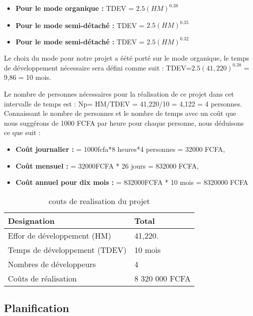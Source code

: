 {{\begin{itemize}[label=\textbullet, font=\LARGE \color{blue}] 
	\item \textbf{Pour le mode organique  :} TDEV = $2.5(HM)^{0.38}$
	\item \textbf{Pour le mode semi-détaché :} TDEV = $2.5(HM)^{0.35}$
	\item \textbf{Pour le mode semi-détaché :} TDEV = $2.5(HM)^{0.32}$
\end{itemize}

Le choix du mode pour notre projet a éété porté sur le mode organique, le temps de développement nécessaire sera défini comme suit :  TDEV=$2.5(41,220)^{0.38}$ = 9,86 = 10 mois.

Le nombre de personnes nécessaires pour la réalisation de ce projet dans cet intervalle de temps est : Np= HM/TDEV = 41,220/10 = 4,122 = 4 personnes. Connaissant le nombre de personnes et le nombre de temps avec un coût que nous suggérons de 1000 FCFA par heure pour chaque personne, nous déduisons ce que suit :

\begin{itemize}[label=\textbullet, font=\LARGE \color{blue}] 
	\item \textbf{Coût journalier  :}  = 1000fcfa*8 heures*4 personnes = 32000 FCFA,
	\item \textbf{Coût mensuel :} = 32000FCFA * 26 jours = 832000 FCFA,
	\item \textbf{Coût annuel pour dix mois :} = 832000FCFA * 10 mois = 8320000 FCFA
\end{itemize}

\begin{table}[H]
	\caption{couts de realisation du projet}
	\label{couts de realisation du projet}
	\centering
	\begin{tabularx}{\linewidth}{|X|X|}
		\hline \rowcolor{lightgray}  
		\textbf  \textbf{Designation} & \textbf{Total}\\
		\hline
		 Effor de développement (HM) &  41,220.\\
		\hline
		Temps de développement (TDEV) &  10 mois\\
		\hline
		 Nombres de développeurs  & 4 \\
		\hline
		 Coûts de réalisation &  8 320 000 FCFA \\	
		\hline		
	\end{tabularx}
\end{table}

\subsection{Planification}

}}

